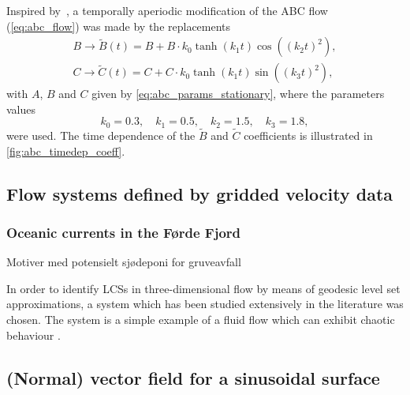 Inspired by~\textcite{oettinger2016autonomous}, a temporally aperiodic
modification of the ABC flow (\cref{eq:abc_flow}) was made by the replacements
\begin{equation}
    \label{eq:abc_params_nonstationary}
    \begin{gathered}
    B\to{}\widetilde{B}(t) = B + B\cdot{}k_{0}\tanh(k_{1}t)\cos({({k_{2}t})}^{2}),\\
    C\to{}\widetilde{C}(t) = C + C\cdot{}k_{0}\tanh(k_{1}t)\sin({({k_{3}t})}^{2}),
    \end{gathered}
\end{equation}
with $A$, $B$ and $C$ given by \cref{eq:abc_params_stationary}, where the
parameters values
\begin{equation}
    \label{eq:abc_params_nonstationary_frequencies}
    k_{0}=0.3,\quad k_{1}=0.5,\quad k_{2}=1.5,\quad k_{3}=1.8,
\end{equation}
were used. The time dependence of the $\widetilde{B}$ and $\widetilde{C}$
coefficients is illustrated in \cref{fig:abc_timedep_coeff}.



\subsection{Flow systems defined by gridded velocity data}
\label{sub:flow_systems_defined_by_gridded_velocity_data}

\subsubsection{Oceanic currents in the Førde Fjord}
\label{ssub:oceanic_currents_in_the_forde_fjord}

\begin{framed}
    Motiver med potensielt sjødeponi for gruveavfall
\end{framed}




In order to identify LCSs in three-dimensional flow by means of geodesic level
set approximations, a system which has been studied extensively in the
literature was chosen. The system is a simple example of a fluid flow which can
exhibit chaotic behaviour \parencite[p.204]{frisch1995turbulence}.


\subsection{(Normal) vector field for a sinusoidal surface}
\label{sub:_normal_vector_field_for_a_sinusoidal_surface}

